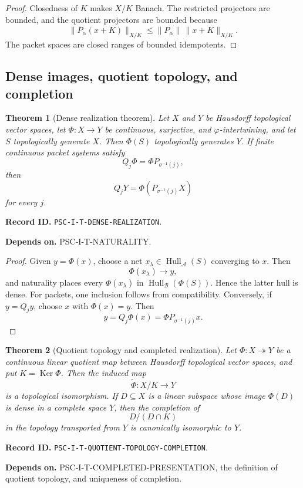 \documentclass[11pt]{article}
\newtheorem{theorem}{Theorem}[section]
\theoremstyle{definition}
\theoremstyle{remark}
\newcommand{\A}{\mathcal A}
\newcommand{\B}{\mathcal B}
\newcommand{\Hull}{\operatorname{Hull}}
\newcommand{\Ker}{\operatorname{Ker}}
\newcommand{\RecordID}[1]{\par\smallskip\noindent\begingroup\footnotesize\color{PSCGray}\raggedright\textbf{Record ID.} \nolinkurl{#1}.\par\endgroup}
\newcommand{\Depends}[1]{\par\noindent\begingroup\footnotesize\color{PSCGray}\raggedright\textbf{Depends on.} #1\par\endgroup}
\begin{document}
\begin{proof}
Closedness of $K$ makes $X/K$ Banach.  The restricted projectors are bounded, and the quotient projectors are bounded because
\[
\|\overline P_\alpha(x+K)\|_{X/K}
\leq
\|P_\alpha\|\,\|x+K\|_{X/K}.
\]
The packet spaces are closed ranges of bounded idempotents.
\end{proof}

\subsection{Dense images, quotient topology, and completion}
\begin{theorem}[Dense realization theorem]
\label{thm:dense-realization}
Let $X$ and $Y$ be Hausdorff topological vector spaces, let $\Phi:X\to Y$ be continuous, surjective, and $\varphi$-intertwining, and let $S$ topologically generate $X$.  Then $\Phi(S)$ topologically generates $Y$.  If finite continuous packet systems satisfy
\[
Q_j\Phi=\Phi P_{\sigma^{-1}(j)},
\]
then
\[
\boxed{
Q_jY=\Phi(P_{\sigma^{-1}(j)}X)
}
\]
for every $j$.
\end{theorem}
\RecordID{PSC-I-T-DENSE-REALIZATION}
\Depends{PSC-I-T-NATURALITY.}

\begin{proof}
Given $y=\Phi(x)$, choose a net $x_\lambda\in\Hull_\A(S)$ converging to $x$.  Then
\[
\Phi(x_\lambda)\to y,
\]
and naturality places every $\Phi(x_\lambda)$ in $\Hull_\B(\Phi(S))$.  Hence the latter hull is dense.  For packets, one inclusion follows from compatibility.  Conversely, if $y=Q_jy$, choose $x$ with $\Phi(x)=y$.  Then
\[
y=Q_j\Phi(x)=\Phi P_{\sigma^{-1}(j)}x.
\]
\end{proof}

\begin{theorem}[Quotient topology and completed realization]
\label{thm:quotient-topology}
Let $\Phi:X\twoheadrightarrow Y$ be a continuous linear quotient map between Hausdorff topological vector spaces, and put $K=\Ker\Phi$.  Then the induced map
\[
\widetilde\Phi:X/K\longrightarrow Y
\]
is a topological isomorphism.  If $D\subseteq X$ is a linear subspace whose image $\Phi(D)$ is dense in a complete space $Y$, then the completion of
\[
D/(D\cap K)
\]
in the topology transported from $Y$ is canonically isomorphic to $Y$.
\end{theorem}
\RecordID{PSC-I-T-QUOTIENT-TOPOLOGY-COMPLETION}
\Depends{PSC-I-T-COMPLETED-PRESENTATION, the definition of quotient topology, and uniqueness of completion.}
\end{document}
